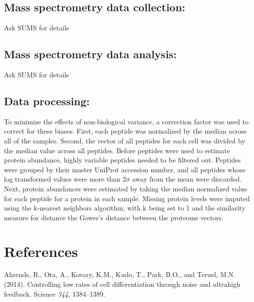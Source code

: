 \documentclass[11pt,twocolumn]{article}
\begin{document}
\hypertarget{mass-spectrometry-data-collection}{%
\subsection{Mass spectrometry data
collection:}\label{mass-spectrometry-data-collection}}

Ask SUMS for details

\hypertarget{mass-spectrometry-data-analysis}{%
\subsection{Mass spectrometry data
analysis:}\label{mass-spectrometry-data-analysis}}

Ask SUMS for details

\hypertarget{data-processing}{%
\subsection{Data processing:}\label{data-processing}}

To minimize the effects of non-biological variance, a correction factor
was used to correct for these biases. First, each peptide was normalized
by the median across all of the samples. Second, the vector of all
peptides for each cell was divided by the median value across all
peptides. Before peptides were used to estimate protein abundance,
highly variable peptides needed to be filtered out. Peptides were
grouped by their master UniProt accession number, and all peptides whose
log transformed values were more than 2\(\sigma\) away from the mean
were discarded. Next, protein abundances were estimated by taking the
median normalized value for each peptide for a protein in each sample.
Missing protein levels were imputed using the k-nearest neighbors
algorithm, with k being set to 1 and the similarity measure for distance
the Gower's distance between the proteome vectors.

\clearpage

\hypertarget{references}{%
\section{References}\label{references}}

\hypertarget{refs}{}
\leavevmode\hypertarget{ref-ahrends2014controlling}{}%
Ahrends, R., Ota, A., Kovary, K.M., Kudo, T., Park, B.O., and Teruel,
M.N. (2014). Controlling low rates of cell differentiation through noise
and ultrahigh feedback. Science \emph{344}, 1384--1389.
\end{document}
